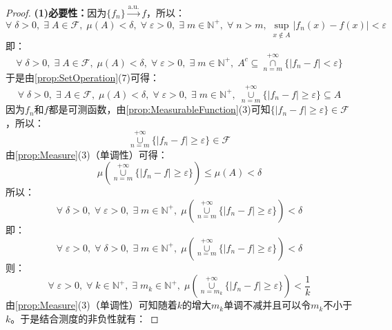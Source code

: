 \begin{proof}
	\textbf{(1)必要性：}因为$\{f_n\}\overset{\text{a.u.}}{\longrightarrow}f$，所以：
	\begin{equation*}
		\forall\;\delta>0,\;\exists\;A\in\mathscr{F},\;\mu(A)<\delta,\;\forall\;\varepsilon>0,\;\exists\;m\in \mathbb{N}^+,\;\forall\;n>m,\;\sup_{x\notin A}|f_n(x)-f(x)|<\varepsilon
	\end{equation*}
	即：
	\begin{equation*}
		\forall\;\delta>0,\;\exists\;A\in\mathscr{F},\;\mu(A)<\delta,\;\forall\;\varepsilon>0,\;\exists\;m\in\mathbb{N}^+,\;A^c\subseteq\underset{n=m}{\overset{+\infty}{\cap}}\{|f_n-f|<\varepsilon\}
	\end{equation*}
	于是由\cref{prop:SetOperation}(7)可得：
	\begin{equation*}
		\forall\;\delta>0,\;\exists\;A\in\mathscr{F},\;\mu(A)<\delta,\;\forall\;\varepsilon>0,\;\exists\;m\in\mathbb{N}^+,\;\underset{n=m}{\overset{+\infty}{\cup}}\{|f_n-f|\geqslant\varepsilon\}\subseteq A
	\end{equation*}
	因为$f_n$和$f$都是可测函数，由\cref{prop:MeasurableFunction}(3)可知$\{|f_n-f|\geqslant\varepsilon\}\in\mathscr{F}$，所以：
	\begin{equation*}
		\underset{n=m}{\overset{+\infty}{\cup}}\{|f_n-f|\geqslant\varepsilon\}\in\mathscr{F}
	\end{equation*}
	由\cref{prop:Measure}(3)（单调性）可得：
	\begin{equation*}
		\mu\left(\underset{n=m}{\overset{+\infty}{\cup}}\{|f_n-f|\geqslant\varepsilon\}\right)\leqslant\mu(A)<\delta
	\end{equation*}
	所以：
	\begin{equation*}
		\forall\;\delta>0,\;\forall\;\varepsilon>0,\;\exists\;m\in\mathbb{N}^+,\;\mu\left(\underset{n=m}{\overset{+\infty}{\cup}}\{|f_n-f|\geqslant\varepsilon\}\right)<\delta
	\end{equation*}
	即：
	\begin{equation*}
		\forall\;\varepsilon>0,\;\forall\;\delta>0,\;\exists\;m\in\mathbb{N}^+,\;\mu\left(\underset{n=m}{\overset{+\infty}{\cup}}\{|f_n-f|\geqslant\varepsilon\}\right)<\delta
	\end{equation*}
	则：
	\begin{equation*}
		\forall\;\varepsilon>0,\;\forall\;k\in\mathbb{N}^+,\;\exists\;m_k\in\mathbb{N}^+,\;\mu\left(\underset{n=m_k}{\overset{+\infty}{\cup}}\{|f_n-f|\geqslant\varepsilon\}\right)<\frac{1}{k}
	\end{equation*}
	由\cref{prop:Measure}(3)（单调性）可知随着$k$的增大$m_k$单调不减并且可以令$m_k$不小于$k$。于是结合测度的非负性就有：

\end{proof}
